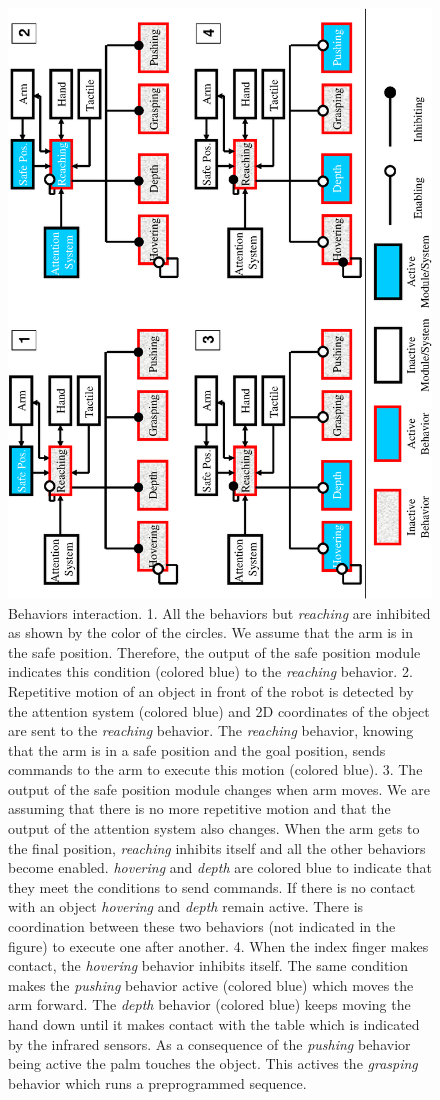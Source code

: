 \begin{figure}[htbp]
  \centerline{
    \includegraphics[height=\columnwidth, angle=270]{./figures/ExpBehavior.eps}
  }
  \caption[Behaviors interaction]{Behaviors interaction. 1. All the behaviors
  but \emph{reaching} are inhibited as shown by the color of the circles.
  We assume that the arm is in the safe position. Therefore, the output of the
  safe position module indicates this condition (colored blue) to the \emph{reaching}
  behavior.
  2. Repetitive motion of an object in
  front of the robot is detected by the attention system (colored blue) and 2D coordinates of
  the object are sent to the \emph{reaching} behavior. The \emph{reaching}
  behavior, knowing that the arm is in a safe position and the
  goal position, sends commands to the arm to execute this motion
  (colored blue).
  3. The output of the safe position module changes when arm moves.
  We are assuming that there is no more repetitive motion and that the output of
  the attention system also changes. When the arm
  gets to the final position, \emph{reaching} inhibits itself and all the other behaviors become
  enabled. \emph{hovering} and \emph{depth} are colored blue
  to indicate that they meet the conditions to send commands. If
  there is no contact with an object \emph{hovering} and \emph{depth} remain active.
  There is coordination between these two behaviors (not indicated in the figure) to execute one after
  another.
  4.
  When the index finger makes contact, the \emph{hovering}
  behavior inhibits itself. The same condition makes the \emph{pushing} behavior
  active (colored blue) which moves the arm forward. The \emph{depth} behavior (colored blue)
  keeps moving the hand down until it makes contact with the table which is indicated
  by the infrared sensors. As a consequence of the \emph{pushing}
  behavior being active the palm touches the object. This actives the \emph{grasping} behavior
   which runs a preprogrammed sequence.
  } \label{fig:expbehaviors}
\end{figure}
%

